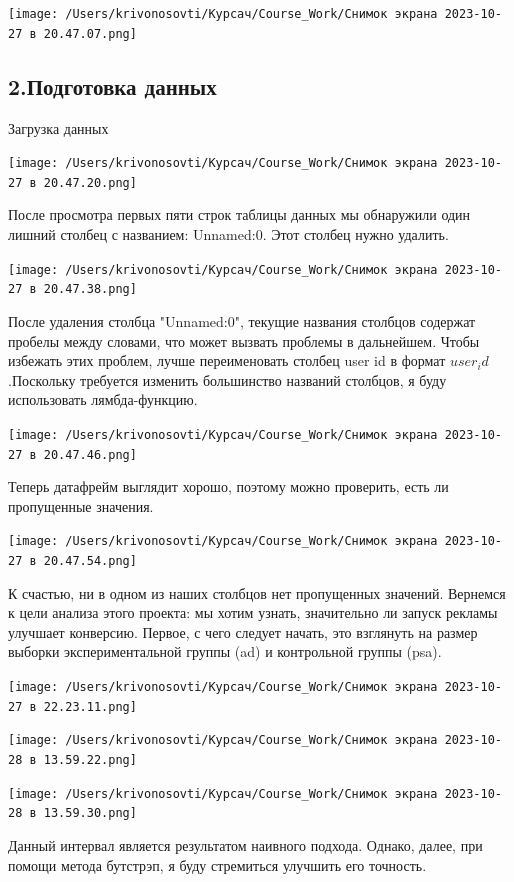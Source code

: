 \documentclass[specialist,
               substylefile = spbu_report.rtx,
               subf,href,colorlinks=true, 12pt]{disser}
\begin{document}
            \texttt{[image: /Users/krivonosovti/Курсач/Course\_Work/Снимок экрана 2023-10-27 в 20.47.07.png]}

    \subsection{2.Подготовка данных}

    Загрузка данных


    \texttt{[image: /Users/krivonosovti/Курсач/Course\_Work/Снимок экрана 2023-10-27 в 20.47.20.png]}


    После просмотра первых пяти строк таблицы данных мы обнаружили один лишний
    столбец с названием: Unnamed:0. Этот столбец нужно удалить.


    \texttt{[image: /Users/krivonosovti/Курсач/Course\_Work/Снимок экрана 2023-10-27 в 20.47.38.png]}



    После удаления столбца "Unnamed:0", текущие названия столбцов содержат пробелы между словами, 
    что может вызвать проблемы в дальнейшем. Чтобы избежать этих проблем, лучше переименовать столбец  user id в формат $user_id$.Поскольку требуется изменить большинство названий столбцов, я буду использовать 
    лямбда-функцию.


    \texttt{[image: /Users/krivonosovti/Курсач/Course\_Work/Снимок экрана 2023-10-27 в 20.47.46.png]}


    Теперь датафрейм выглядит хорошо, поэтому можно проверить, есть ли пропущенные значения.


    \texttt{[image: /Users/krivonosovti/Курсач/Course\_Work/Снимок экрана 2023-10-27 в 20.47.54.png]}


    К счастью, ни в одном из наших столбцов нет пропущенных значений. Вернемся к цели анализа этого 
    проекта: мы хотим узнать, значительно ли запуск рекламы улучшает конверсию. Первое, с чего следует 
    начать, это взглянуть на размер выборки экспериментальной группы (ad) и контрольной группы (psa).


    \texttt{[image: /Users/krivonosovti/Курсач/Course\_Work/Снимок экрана 2023-10-27 в 22.23.11.png]}

    \texttt{[image: /Users/krivonosovti/Курсач/Course\_Work/Снимок экрана 2023-10-28 в 13.59.22.png]}

    \texttt{[image: /Users/krivonosovti/Курсач/Course\_Work/Снимок экрана 2023-10-28 в 13.59.30.png]}


    Данный интервал является результатом наивного подхода. Однако, далее, при помощи метода бутстрэп, я буду стремиться улучшить его точность. 
\end{document}
